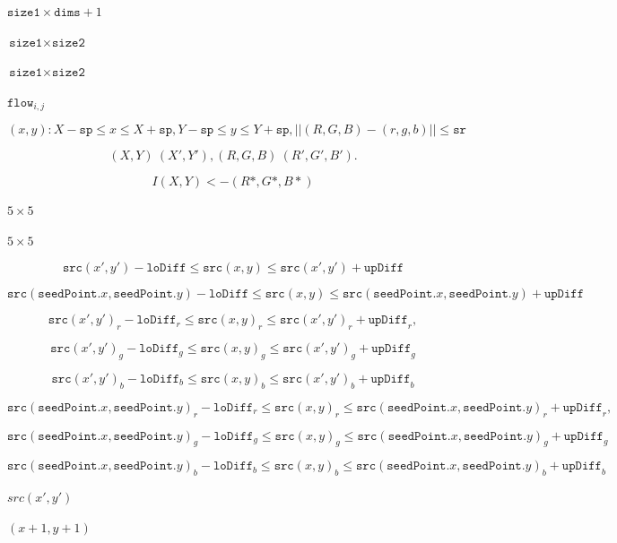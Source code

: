 \documentclass{article}
\begin{document}
$\texttt{size1}\times \texttt{dims}+1$
\pagebreak

$\texttt{size1}\times \texttt{size2}$
\pagebreak

$\texttt{size1} \times \texttt{size2}$
\pagebreak

$\texttt{flow}_{i,j}$
\pagebreak

\[(x,y): X- \texttt{sp} \le x  \le X+ \texttt{sp} , Y- \texttt{sp} \le y  \le Y+ \texttt{sp} , ||(R,G,B)-(r,g,b)||   \le \texttt{sr}\]
\pagebreak

\[(X,Y)~(X',Y'), (R,G,B)~(R',G',B').\]
\pagebreak

\[I(X,Y) <- (R*,G*,B*)\]
\pagebreak

$5\times 5$
\pagebreak

$5\times
5$
\pagebreak

\[\texttt{src} (x',y')- \texttt{loDiff} \leq \texttt{src} (x,y)  \leq \texttt{src} (x',y')+ \texttt{upDiff}\]
\pagebreak

\[\texttt{src} ( \texttt{seedPoint} .x, \texttt{seedPoint} .y)- \texttt{loDiff} \leq \texttt{src} (x,y)  \leq \texttt{src} ( \texttt{seedPoint} .x, \texttt{seedPoint} .y)+ \texttt{upDiff}\]
\pagebreak

\[\texttt{src} (x',y')_r- \texttt{loDiff} _r \leq \texttt{src} (x,y)_r \leq \texttt{src} (x',y')_r+ \texttt{upDiff} _r,\]
\pagebreak

\[\texttt{src} (x',y')_g- \texttt{loDiff} _g \leq \texttt{src} (x,y)_g \leq \texttt{src} (x',y')_g+ \texttt{upDiff} _g\]
\pagebreak

\[\texttt{src} (x',y')_b- \texttt{loDiff} _b \leq \texttt{src} (x,y)_b \leq \texttt{src} (x',y')_b+ \texttt{upDiff} _b\]
\pagebreak

\[\texttt{src} ( \texttt{seedPoint} .x, \texttt{seedPoint} .y)_r- \texttt{loDiff} _r \leq \texttt{src} (x,y)_r \leq \texttt{src} ( \texttt{seedPoint} .x, \texttt{seedPoint} .y)_r+ \texttt{upDiff} _r,\]
\pagebreak

\[\texttt{src} ( \texttt{seedPoint} .x, \texttt{seedPoint} .y)_g- \texttt{loDiff} _g \leq \texttt{src} (x,y)_g \leq \texttt{src} ( \texttt{seedPoint} .x, \texttt{seedPoint} .y)_g+ \texttt{upDiff} _g\]
\pagebreak

\[\texttt{src} ( \texttt{seedPoint} .x, \texttt{seedPoint} .y)_b- \texttt{loDiff} _b \leq \texttt{src} (x,y)_b \leq \texttt{src} ( \texttt{seedPoint} .x, \texttt{seedPoint} .y)_b+ \texttt{upDiff} _b\]
\pagebreak

$src(x',y')$
\pagebreak

$(x+1, y+1)$
\pagebreak
\end{document}
